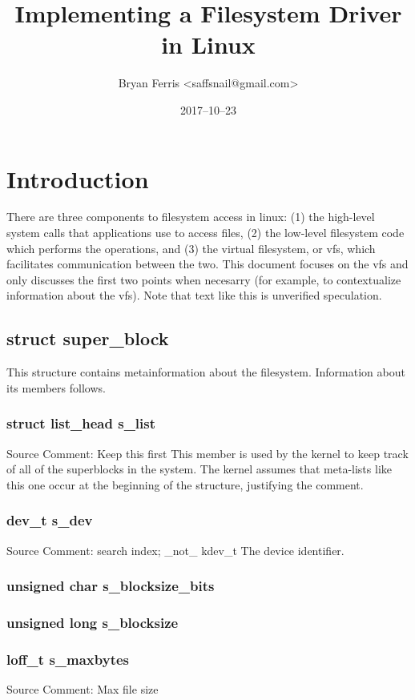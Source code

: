 \documentclass{article}
\title{Implementing a Filesystem Driver in Linux}
\date{2017--10--23}
\author{Bryan Ferris \textless{}saffsnail@gmail.com\textgreater{}}
\newcommand{\sourcecomment}[2][]{Source Comment: #2 \newline #1}
\newcommand{\speculative}[1]{{\color{speculative} #1}}
\begin{document}
\maketitle

\section{Introduction}

There are three components to filesystem access in linux: (1) the high-level
system calls that applications use to access files, (2) the low-level
filesystem code which performs the operations, and (3) the virtual filesystem,
or vfs, which facilitates communication between the two. This document focuses
on the vfs and only discusses the first two points when necesarry (for example,
to contextualize information about the vfs). Note that \speculative{text like
this is unverified speculation}.

\subsection{struct super_block}
This structure contains metainformation about the filesystem. Information about
its members follows.

\subsubsection{struct list_head s_list}
\sourcecomment{Keep this first}
This member is used by the kernel to keep track of all of the superblocks in
the system. \speculative{The kernel assumes that meta-lists like this one occur
at the beginning of the structure, justifying the comment.}

\subsubsection{dev_t s_dev}
\sourcecomment{search index; _not_ kdev_t}
The device identifier. 

\subsubsection{unsigned char s_blocksize_bits}
\subsubsection{unsigned long s_blocksize}
\subsubsection{loff_t s_maxbytes}
\sourcecomment{Max file size}
\end{document}
